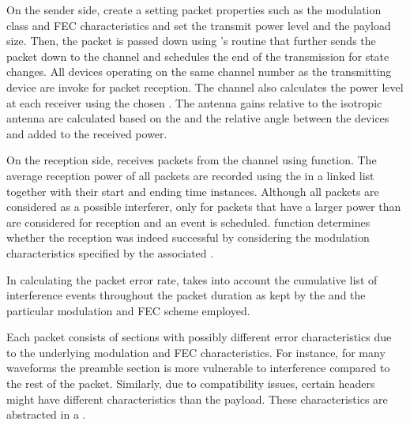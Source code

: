 On the sender side, 
 create a  setting packet properties such as the modulation class and FEC characteristics and set the transmit power level and the payload size. 
Then, the packet is passed down using 's  routine that further sends the packet down to the channel and schedules the end of the transmission for state changes. 
All devices operating on the same channel number as the transmitting device are invoke for packet reception. The channel also calculates the power level at each receiver using the chosen . The antenna gains relative to the isotropic antenna are calculated based on the  and the relative angle between the devices and added to the received power.




On the reception side,  receives packets from the channel using  function. The average reception power of all packets are recorded using the  in a linked list together with their start and ending time instances. 
Although all packets are considered as a possible interferer, only for packets that have a larger power than  are considered for reception and an  event is scheduled.  function determines whether the reception was indeed successful by considering the modulation characteristics specified by the associated .


In calculating the packet error rate,  takes into account the cumulative list of interference events throughout the packet duration as kept by the and the particular modulation and FEC scheme employed. 

Each packet consists of sections with possibly different error characteristics due to the underlying modulation and FEC characteristics. For instance, for many waveforms the preamble section is more vulnerable to interference compared to the rest of the packet. Similarly, due to compatibility issues, certain headers might have different characteristics than the payload. These characteristics are abstracted in a . 

